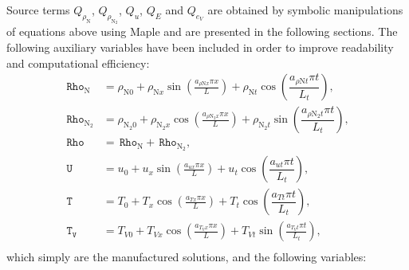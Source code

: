 \documentclass[10pt]{article}
\newcommand{\Rho}{\,\mathtt{Rho}}
\newcommand{\T}{\,\mathtt{T}}
\newcommand{\U}{\,\mathtt{U}}
\newcommand{\TV}{\,\mathtt{T_V}}
\begin{document}
Source terms $ Q_{\rho_{\text{N}}}$, $ Q_{\rho_{\text{N}_2}}$, $Q_u$,  $Q_{E}$ and $Q_{e_V}$ are obtained by symbolic manipulations of equations above using Maple and are presented in the following sections. The following auxiliary variables have been included in order to improve readability and computational efficiency:
\begin{equation}
 \begin{split}
\label{eq:aux_01}
\Rho_{\text{N}} &= \rho_{\text{N}0} + \rho_{\text{N}x} \sin\left(\frac{a_{  \rho \text{N} x }\pi x}{L}\right)+\rho_{\text{N}t} \cos\left( \dfrac{ a_{ \rho \text{N} t}  \pi t}{L_t}\right),\\
\Rho_{\text{N}_2} &= \rho_{\text{N}_2 0}+ \rho_{\text{N}_2 x} \cos\left(\frac{a_{ \rho \text{N}_2 x } \pi x}{L}\right)+\rho_{\text{N}_2 t} \sin\left( \dfrac{ a_{ \rho \text{N}_2 t}\pi t}{L_t}\right),\\
\Rho&=\Rho_{\text{N}}+\Rho_{\text{N}_2},\\
\U &=  u_{0}+u_{x} \sin\left(\frac{a_{u x} \pi x}{L}\right)+ u_t \cos\left( \dfrac{ a_{ut}\pi t}{L_t}\right),\\
\T &=  T_{0}+T_{x} \cos\left(\frac{a_{T x} \pi x}{L}\right)+ T_t \cos\left( \dfrac{ a_{Tt} \pi t}{L_t}\right),\\
\TV &=T_{V0}+T_{Vx} \cos\left(\frac{a_{T_V x} \pi x}{L}\right)+T_{Vt}\sin\left(\frac{a_{T_V t} \pi t}{L_t}\right),\\
\end{split}
\end{equation}
which simply are the manufactured solutions, and the following variables:
\end{document}
